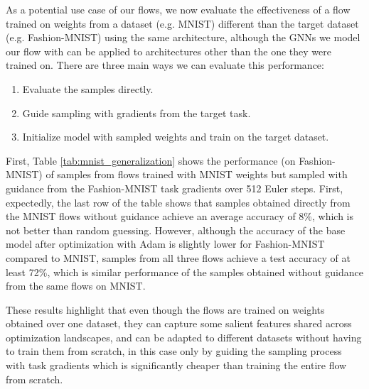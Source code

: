 As a potential use case of our flows, we now evaluate the effectiveness of a flow trained on weights from a dataset (e.g. MNIST) different than the target dataset (e.g. Fashion-MNIST) using the same architecture, although the GNNs we model our flow with can be applied to architectures other than the one they were trained on. There are three main ways we can evaluate this performance:
\begin{enumerate}
    \item Evaluate the samples directly.
    \item Guide sampling with gradients from the target task. 
    \item Initialize model with sampled weights and train on the target dataset.
\end{enumerate}

First, Table \ref{tab:mnist_generalization} shows the performance (on Fashion-MNIST) of samples from flows trained with MNIST weights but sampled with guidance from the Fashion-MNIST task gradients over 512 Euler steps. First, expectedly, the last row of the table shows that samples obtained directly from the MNIST flows without guidance achieve an average accuracy of 8\%, which is not better than random guessing. However, although the accuracy of the base model after optimization with Adam is slightly lower for Fashion-MNIST compared to MNIST, samples from all three flows achieve a test accuracy of at least 72\%, which is similar performance of the samples obtained without guidance from the same flows on MNIST. 

These results highlight that even though the flows are trained on weights obtained over one dataset, they can capture some salient features shared across optimization landscapes, and can be adapted to different datasets without having to train them from scratch, in this case only by guiding the sampling process with task gradients which is significantly cheaper than training the entire flow from scratch.  

